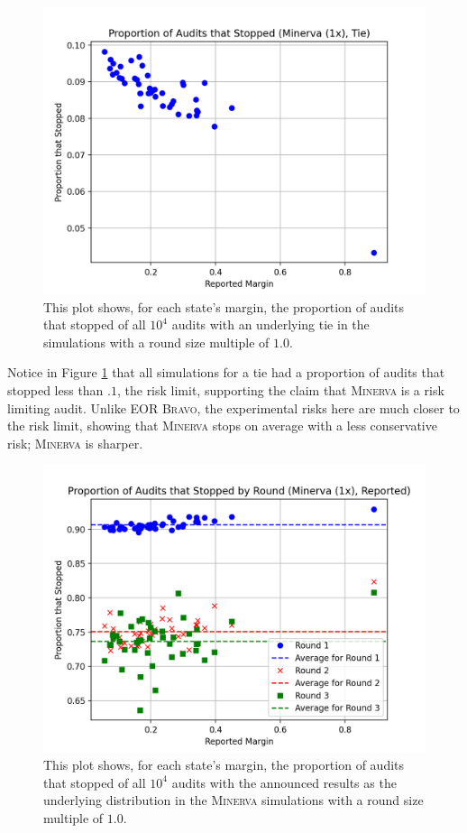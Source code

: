 \documentclass[runningheads]{llncs}
\newcommand{\Minerva}{\textsc{Minerva}\xspace}
\newcommand{\BRAVO}{\textsc{Bravo}\xspace}
\begin{document}
\begin{figure}[H]
\includegraphics[width=\textwidth]{minerva_multiround_1x_10^4/total_risk.png}
\caption{This plot shows, for each state's margin, the proportion of audits that stopped of
all $10^4$ audits with an underlying tie in the simulations with a round size multiple of $1.0$.}
\label{fig:minerva1_risk}
\end{figure}

Notice in Figure \ref{fig:minerva1_risk} that all simulations for a tie had a proportion of audits that stopped less than $.1$, the risk limit, supporting
the claim that \Minerva is a risk limiting audit. 
Unlike EOR \BRAVO, the experimental risks here are much closer to the risk limit,
showing that \Minerva stops on average with a less conservative risk; \Minerva is sharper.

\begin{figure}[H]
\includegraphics[width=\textwidth]{minerva_multiround_1x_10^4/sprobs_first_three.png}
\caption{This plot shows, for each state's margin, the proportion of audits that stopped of
all $10^4$ audits with the announced results as the underlying distribution
in the \Minerva simulations with a round size multiple of $1.0$.}
\label{fig:minerva1_sprob}
\end{figure}
\end{document}
